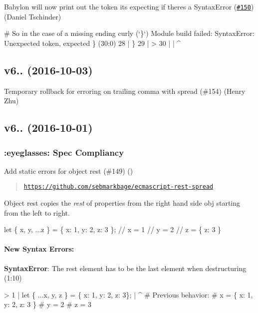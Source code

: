 Babylon will now print out the token it\textquotesingle{}s expecting if there\textquotesingle{}s a {\ttfamily Syntax\+Error} (\href{https://github.com/babel/babylon/pull/150}{\tt \#150}) (Daniel Tschinder)


\begin{DoxyCode}
# So in the case of a missing ending curly (`\}`)
Module build failed: SyntaxError: Unexpected token, expected \} (30:0)
  28 |   \}
  29 |
> 30 |
     | ^
\end{DoxyCode}


\subsection*{v6.. (2016-\/10-\/03)}

Temporary rollback for erroring on trailing comma with spread (\#154) (Henry Zhu)

\subsection*{v6.. (2016-\/10-\/01)}

\subsubsection*{\+:eyeglasses\+: Spec Compliancy}

Add static errors for object rest (\#149) (\href{https://github.com/danez}{\tt })

\begin{quote}
\href{https://github.com/sebmarkbage/ecmascript-rest-spread}{\tt https\+://github.\+com/sebmarkbage/ecmascript-\/rest-\/spread} \end{quote}


Object rest copies the {\itshape rest} of properties from the right hand side {\ttfamily obj} starting from the left to right.


\begin{DoxyCode}
let \{ x, y, ...z \} =  \{ x: 1, y: 2, z: 3 \};
// x = 1
// y = 2
// z = \{ z: 3 \}
\end{DoxyCode}


\paragraph*{New Syntax Errors\+:}

{\bfseries Syntax\+Error}\+: The rest element has to be the last element when destructuring (1\+:10) 
\begin{DoxyCode}
> 1 | let \{ ...x, y, z \} = \{ x: 1, y: 2, z: 3\};
    |           ^
# Previous behavior:
# x = \{ x: 1, y: 2, z: 3 \}
# y = 2
# z = 3
\end{DoxyCode}


